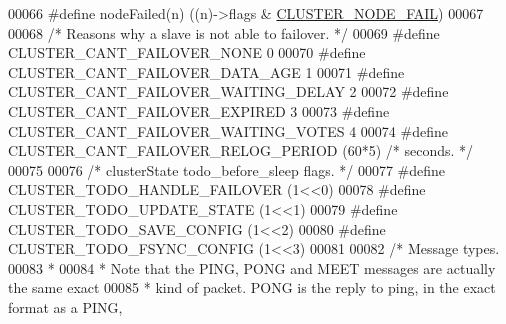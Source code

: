 \begin{DoxyCode}
00066 \textcolor{preprocessor}{#}\textcolor{preprocessor}{define} \textcolor{preprocessor}{nodeFailed}\textcolor{preprocessor}{(}\textcolor{preprocessor}{n}\textcolor{preprocessor}{)} \textcolor{preprocessor}{(}\textcolor{preprocessor}{(}\textcolor{preprocessor}{n}\textcolor{preprocessor}{)}\textcolor{preprocessor}{->}\textcolor{preprocessor}{flags} \textcolor{preprocessor}{&} \hyperlink{cluster_8h_ad211e85c7baf8a5a59acd747e4e9005a}{CLUSTER\_NODE\_FAIL}\textcolor{preprocessor}{)}
00067 
00068 \textcolor{comment}{/* Reasons why a slave is not able to failover. */}
00069 \textcolor{preprocessor}{#}\textcolor{preprocessor}{define} \textcolor{preprocessor}{CLUSTER\_CANT\_FAILOVER\_NONE} 0
00070 \textcolor{preprocessor}{#}\textcolor{preprocessor}{define} \textcolor{preprocessor}{CLUSTER\_CANT\_FAILOVER\_DATA\_AGE} 1
00071 \textcolor{preprocessor}{#}\textcolor{preprocessor}{define} \textcolor{preprocessor}{CLUSTER\_CANT\_FAILOVER\_WAITING\_DELAY} 2
00072 \textcolor{preprocessor}{#}\textcolor{preprocessor}{define} \textcolor{preprocessor}{CLUSTER\_CANT\_FAILOVER\_EXPIRED} 3
00073 \textcolor{preprocessor}{#}\textcolor{preprocessor}{define} \textcolor{preprocessor}{CLUSTER\_CANT\_FAILOVER\_WAITING\_VOTES} 4
00074 \textcolor{preprocessor}{#}\textcolor{preprocessor}{define} \textcolor{preprocessor}{CLUSTER\_CANT\_FAILOVER\_RELOG\_PERIOD} \textcolor{preprocessor}{(}60\textcolor{preprocessor}{*}5\textcolor{preprocessor}{)} \textcolor{comment}{/* seconds. */}
00075 
00076 \textcolor{comment}{/* clusterState todo\_before\_sleep flags. */}
00077 \textcolor{preprocessor}{#}\textcolor{preprocessor}{define} \textcolor{preprocessor}{CLUSTER\_TODO\_HANDLE\_FAILOVER} \textcolor{preprocessor}{(}1\textcolor{preprocessor}{<<}0\textcolor{preprocessor}{)}
00078 \textcolor{preprocessor}{#}\textcolor{preprocessor}{define} \textcolor{preprocessor}{CLUSTER\_TODO\_UPDATE\_STATE} \textcolor{preprocessor}{(}1\textcolor{preprocessor}{<<}1\textcolor{preprocessor}{)}
00079 \textcolor{preprocessor}{#}\textcolor{preprocessor}{define} \textcolor{preprocessor}{CLUSTER\_TODO\_SAVE\_CONFIG} \textcolor{preprocessor}{(}1\textcolor{preprocessor}{<<}2\textcolor{preprocessor}{)}
00080 \textcolor{preprocessor}{#}\textcolor{preprocessor}{define} \textcolor{preprocessor}{CLUSTER\_TODO\_FSYNC\_CONFIG} \textcolor{preprocessor}{(}1\textcolor{preprocessor}{<<}3\textcolor{preprocessor}{)}
00081 
00082 \textcolor{comment}{/* Message types.}
00083 \textcolor{comment}{ *}
00084 \textcolor{comment}{ * Note that the PING, PONG and MEET messages are actually the same exact}
00085 \textcolor{comment}{ * kind of packet. PONG is the reply to ping, in the exact format as a PING,}

\end{DoxyCode}
